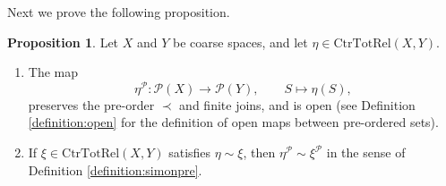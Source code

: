 \documentclass[12pt, a4paper]{amsart}
\theoremstyle{definition}
\newtheorem{proposition}[theorem]{Proposition}
\newcommand{\CtrTotRel}{\mathrm{CtrTotRel}}
\begin{document}
Next we prove the following proposition.

\begin{proposition}\label{proposition:Pc_functorial}
Let
$X$ and $Y$ be coarse spaces, and let
$\eta\in\CtrTotRel(X,Y)$.

\begin{enumerate}
\item
The map
\[
\eta^{\mathcal{P}}:
\mathcal{P}(X)\to\mathcal{P}(Y),
\qquad
S\mapsto\eta(S),
\]
preserves the pre-order
$\prec$
and finite joins, and is open (see Definition \ref{definition:open} for the definition of open maps between pre-ordered sets).
\item
If
$\xi\in\CtrTotRel(X,Y)$
satisfies
$\eta\sim\xi$,
then
$\eta^{\mathcal{P}}\sim\xi^{\mathcal{P}}$ in the sense of Definition \ref{definition:simonpre}.
\end{enumerate}
\end{proposition}
\end{document}

